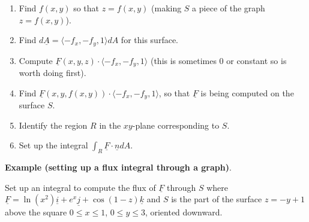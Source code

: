 \documentclass[12pt,letterpaper,noanswers]{exam}
\newcommand{\mb}[1]{\underline{#1}}
\begin{document}
\begin{enumerate}
\itemsep3em
    \item Find $f(x,y)$ so that $z = f(x,y)$ (making $S$ a piece of the graph $z = f(x,y)$).  %
    \item Find $d\mb A = \langle -f_x, -f_y, 1\rangle dA$ for this surface. %
    \item Compute $\mb F(x,y,z)\cdot \langle -f_x, -f_y, 1\rangle$ (this is sometimes $0$ or constant so is worth doing first).  %
    \item Find $\mb F(x,y,f(x,y))\cdot \langle -f_x, -f_y, 1\rangle$, so that $\mb F$ is being computed on the surface $S$. %
    \item Identify the region $R$ in the $xy$-plane corresponding to $S$.  %
    \item Set up the integral $\displaystyle \int_R \mb F\cdot \mb n dA$.  %
    \vspace{1in}
\end{enumerate}

\noindent\textbf{Example (setting up a flux integral through a graph)}.

Set up an integral to compute the flux of $\mb F$ through $S$ where $\mb F = \ln(x^2)\mb i + e^x\mb j + \cos(1-z)\mb k$ and $S$ is the part of the surface $z = -y+1$ above the square $0\leq x\leq 1$, $0\leq y\leq 3$, oriented downward.


\vspace{2in}
\end{document}
